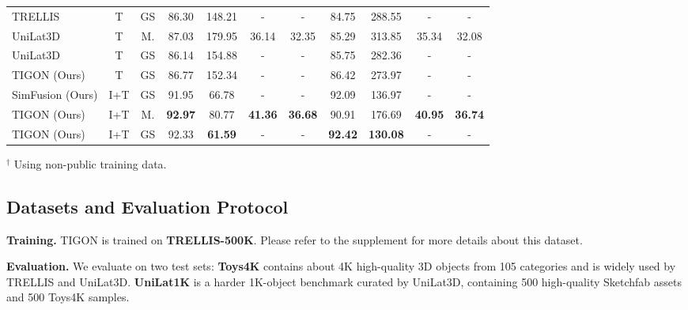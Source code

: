 \begin{table}[t]
\begin{tabular}{lcc|cccc|cccc}
TRELLIS                               & T & GS  & 86.30 & 148.21 &   -   &   -   & 84.75 & 288.55 &   -   &   -   \\
UniLat3D                              & T & M.  & 87.03 & 179.95 & 36.14 & 32.35 & 85.29 & 313.85 & 35.34 & 32.08 \\
UniLat3D                              & T & GS  & 86.14 & 154.88 &   -   &   -   & 85.75 & 282.36 &   -   &   -   \\
\rowcolor{rowgray} TIGON (Ours)       & T & GS  & 86.77 & 152.34 &   -   &   -   & 86.42 & 273.97 &   -   &   -   \\
\midrule
SimFusion (Ours)       & I+T & GS  & 91.95 &  66.78 &  - & -  & 92.09 & 136.97 & - & - \\
\rowcolor{rowgray} TIGON (Ours)       & I+T & M.  & \textbf{92.97} &  80.77 & \textbf{41.36} & \textbf{36.68} & 90.91 & 176.69 & \textbf{40.95} & \textbf{36.74} \\
\rowcolor{rowgray} TIGON (Ours)       & I+T & GS & 92.33 & \textbf{61.59} &   -   &   -   & \textbf{92.42} & \textbf{130.08} &   -   &   -   \\
\bottomrule
\end{tabular}
\begin{flushleft}
$^{\dagger}$ Using non-public training data.
\end{flushleft}
\end{table}

\subsection{Datasets and Evaluation Protocol}
\label{sec:eval_metric}
\noindent\textbf{Training.} TIGON is trained on \textbf{TRELLIS-500K}. Please refer to the supplement for more details about this dataset.


\noindent\textbf{Evaluation.} We evaluate on two test sets:
\textbf{Toys4K} contains about 4K high-quality 3D objects from 105 categories and is widely used by TRELLIS and UniLat3D. \textbf{UniLat1K} is a harder 1K-object benchmark curated by UniLat3D, containing 500 high-quality Sketchfab assets and 500 Toys4K samples.


